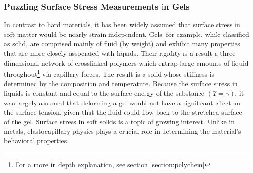 \subsubsection{Puzzling Surface Stress Measurements in Gels}
In contrast to hard materials, it has been widely assumed that surface stress in soft matter would be nearly strain-independent. Gels, for example, while classified as solid, are comprised mainly of fluid (by weight) and exhibit many properties that are more closely associated with liquids. Their rigidity is a result a three-dimensional network of crosslinked polymers which entrap large amounts of liquid throughout\footnote{For a more in depth explanation, see section \ref{section:polychem}} via capillary forces. The result is a solid whose stiffness is determined by the composition and temperature. Because the surface stress in liquids is constant and equal to the surface energy of the substance $(\Upsilon = \gamma)$, it was largely assumed that deforming a gel would not have a significant effect on the surface tension, given that the fluid could flow back to the stretched surface of the gel. Surface stress in soft solids is a topic of growing interest. Unlike in metals, elastocapillary physics plays a crucial role in determining the material's behavioral properties.  

